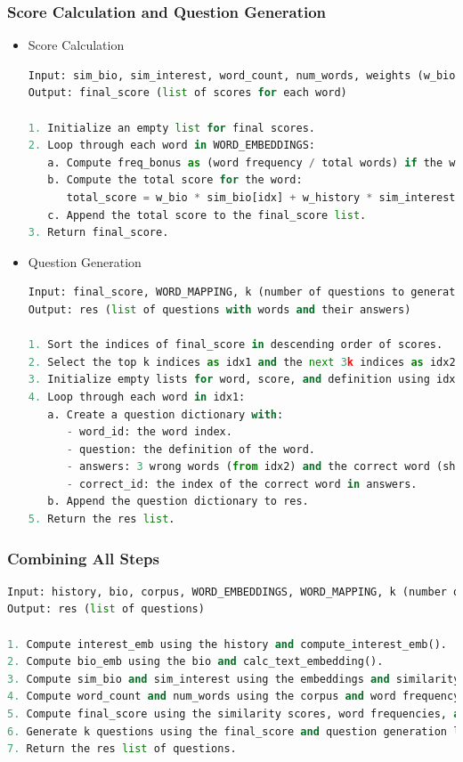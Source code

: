 \documentclass{article}
\begin{document}
\subsubsection{Score Calculation and Question Generation}
\begin{itemize}
\item Score Calculation
\begin{lstlisting}[language=Python]
Input: sim_bio, sim_interest, word_count, num_words, weights (w_bio, w_freq, w_history)
Output: final_score (list of scores for each word)

1. Initialize an empty list for final scores.
2. Loop through each word in WORD_EMBEDDINGS:
   a. Compute freq_bonus as (word frequency / total words) if the word exists in word_count; otherwise, set freq_bonus = 0.
   b. Compute the total score for the word:
      total_score = w_bio * sim_bio[idx] + w_history * sim_interest[idx] + w_freq * freq_bonus.
   c. Append the total score to the final_score list.
3. Return final_score.
\end{lstlisting}

\item Question Generation
\begin{lstlisting}[language=Python]
Input: final_score, WORD_MAPPING, k (number of questions to generate)
Output: res (list of questions with words and their answers)

1. Sort the indices of final_score in descending order of scores.
2. Select the top k indices as idx1 and the next 3k indices as idx2 (shuffle idx2 for wrong answers).
3. Initialize empty lists for word, score, and definition using idx1.
4. Loop through each word in idx1:
   a. Create a question dictionary with:
      - word_id: the word index.
      - question: the definition of the word.
      - answers: 3 wrong words (from idx2) and the correct word (shuffled).
      - correct_id: the index of the correct word in answers.
   b. Append the question dictionary to res.
5. Return the res list.
\end{lstlisting}
\end{itemize}

\subsubsection{Combining All Steps}
\begin{lstlisting}[language=Python]
Input: history, bio, corpus, WORD_EMBEDDINGS, WORD_MAPPING, k (number of questions)
Output: res (list of questions)

1. Compute interest_emb using the history and compute_interest_emb().
2. Compute bio_emb using the bio and calc_text_embedding().
3. Compute sim_bio and sim_interest using the embeddings and similarity computation.
4. Compute word_count and num_words using the corpus and word frequency count.
5. Compute final_score using the similarity scores, word frequencies, and weights.
6. Generate k questions using the final_score and question generation logic.
7. Return the res list of questions.
\end{lstlisting}
\end{document}
